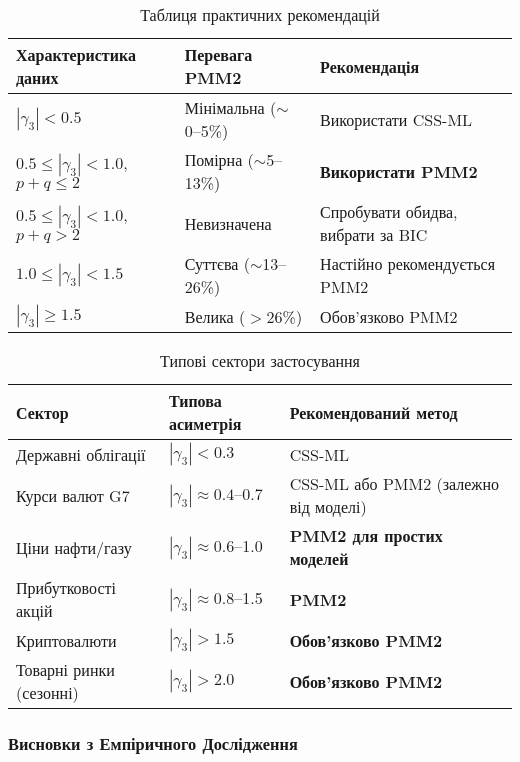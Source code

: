 \documentclass[12pt,a4paper]{article}
\begin{document}
\begin{table}[htbp]
\centering
\caption{Таблиця практичних рекомендацій}
\label{tab:wti_practical_recommendations}
\begin{tabular}{@{}lll@{}}
\toprule
\textbf{Характеристика даних} & \textbf{Перевага PMM2} & \textbf{Рекомендація} \\
\midrule
$|\gamma_3| < 0.5$ & Мінімальна ($\sim$0--5\%) & Використати CSS-ML \\
$0.5 \leq |\gamma_3| < 1.0$, $p+q \leq 2$ & Помірна ($\sim$5--13\%) & \textbf{Використати PMM2} \\
$0.5 \leq |\gamma_3| < 1.0$, $p+q > 2$ & Невизначена & Спробувати обидва, вибрати за BIC \\
$1.0 \leq |\gamma_3| < 1.5$ & Суттєва ($\sim$13--26\%) & Настійно рекомендується PMM2 \\
$|\gamma_3| \geq 1.5$ & Велика ($>$26\%) & Обов'язково PMM2 \\
\bottomrule
\end{tabular}
\end{table}

\begin{table}[htbp]
\centering
\caption{Типові сектори застосування}
\label{tab:wti_sector_recommendations}
\begin{tabular}{@{}lll@{}}
\toprule
\textbf{Сектор} & \textbf{Типова асиметрія} & \textbf{Рекомендований метод} \\
\midrule
Державні облігації & $|\gamma_3| < 0.3$ & CSS-ML \\
Курси валют G7 & $|\gamma_3| \approx 0.4$--0.7 & CSS-ML або PMM2 (залежно від моделі) \\
Ціни нафти/газу & $|\gamma_3| \approx 0.6$--1.0 & \textbf{PMM2 для простих моделей} \\
Прибутковості акцій & $|\gamma_3| \approx 0.8$--1.5 & \textbf{PMM2} \\
Криптовалюти & $|\gamma_3| > 1.5$ & \textbf{Обов'язково PMM2} \\
Товарні ринки (сезонні) & $|\gamma_3| > 2.0$ & \textbf{Обов'язково PMM2} \\
\bottomrule
\end{tabular}
\end{table}

\subsubsection{Висновки з Емпіричного Дослідження}
\label{subsubsec:wti_empirical_conclusions}
\end{document}
